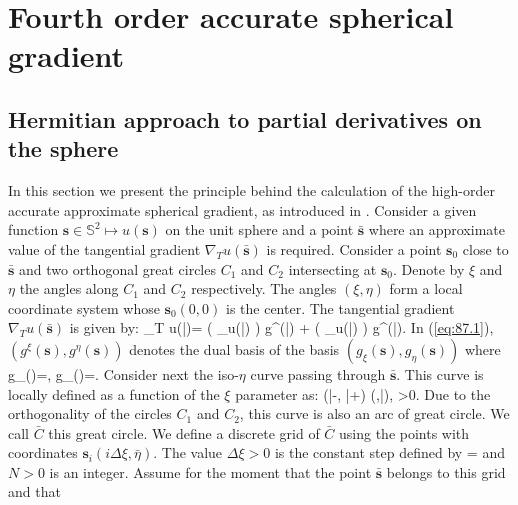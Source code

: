 
\section{Fourth order accurate spherical gradient}
\label{sec:2}
\subsection{Hermitian approach to partial derivatives on the sphere}
\label{sec:2.1}
In this section we present the principle
behind the calculation of the high-order accurate
approximate spherical gradient, as introduced in 
\cite{Croisille-10, Croisille-12}.
Consider a given function $ \mathbf{s} \in \mathbb{S}^2 \mapsto u(\mathbf{s})$ on the unit sphere
and a point $\bar{\mathbf{s}}$ where an approximate value of the tangential gradient
$\nabla_T u(\bar{\mathbf{s}})$ is required.
Consider a point $\mathbf{s}_0$ close to $\bar{\mathbf{s}}$ and two orthogonal great circles
$C_1$ and $C_2$ intersecting at $\mathbf{s}_0$. 
Denote by $\xi$ and $\eta$ the angles along $C_1$ and $C_2$ respectively.
The angles $(\xi,\eta)$ form a local coordinate system 
whose $\mathbf{s}_0(0,0)$ is the center. 
The tangential gradient $\nabla_T u(\bar{\mathbf{s}})$  is given by:
\beq
\label{eq:87.1}
\nabla_T u(\bar{})=
\Big(
\partial_\xi u(\bar{})
\Big)
g^\xi(\bar{})
+
\Big(
\partial_\eta u(\bar{})
\Big)
g^\eta(\bar{}).
\eeq
In (\ref{eq:87.1}), $(g^\xi(\mathbf{s}),g^\eta(\mathbf{s}))$
denotes the dual basis of the basis 
$(g_\xi(\mathbf{s}),g_\eta(\mathbf{s}))$ where
\beq
\label{eq:32.19}
g_\xi()=,\;\;\;
g_\eta()=.
\eeq
Consider next the iso-$\eta$ curve passing through $\bar{\mathbf{s}}$.
This curve is locally defined as a function of the $\xi$ parameter as:
\beq
 \xi \in (\bar{\xi}-\varepsilon, \bar{\xi}+\varepsilon)
 \mapsto {}(\xi,\bar{\eta}), \;\;\; \varepsilon >0.
\eeq
Due to the orthogonality of the circles $C_1$ and $C_2$, this curve
is also an arc of great circle. We call $\bar{C}$ this great circle.
We define a discrete grid of $\bar{C}$ 
using the points with coordinates $\mathbf{s}_i(i\Delta \xi,\bar{\eta})$. The value
$\Delta \xi >0 $ is the constant step defined by
\beq
\Delta \xi = 
\eeq 
and $N>0$ is an integer.
Assume for the moment that the point $\bar{\mathbf{s}}$ belongs to this grid and that 
